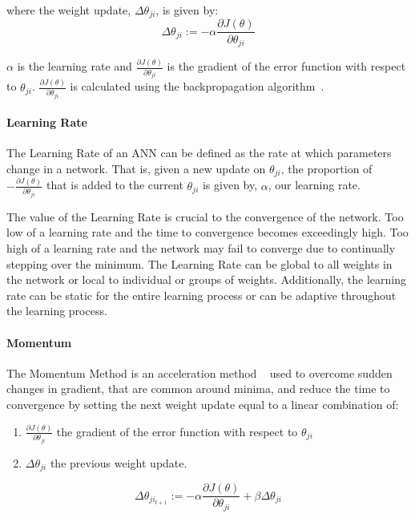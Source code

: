 \documentclass{article}
\begin{document}
where the weight update, $\Delta\theta_{ji}$, is given by:
\begin{equation}
	\Delta\theta_{ji} := -\alpha\frac{\partial{J}(\theta)}{\partial{\theta_{ji}}}
\end{equation}
 

 $\alpha$ is the learning rate and $\frac{\partial{J}(\theta)}{\partial{\theta_{ji}}}$ is the gradient of the error function with respect to $\theta_{ji}$.
$\frac{\partial{J}(\theta)}{\partial{\theta_{ji}}}$ is calculated using the backpropagation algorithm~\cite{backpropagationOriginal]}.

 
\paragraph{Learning Rate}
The Learning Rate of an ANN can be defined as the rate at which parameters change in a network. That is, given a new update on $\theta_{ji}$, the proportion of $-\frac{\partial{J}(\theta)}{\partial{\theta_{ji}}}$ that is added to the current $\theta_{ji}$ is given by, $\alpha$, our learning rate.
\hfill\newline

The value of the Learning Rate is crucial to the convergence of the network. Too low of a learning rate and the time to convergence becomes exceedingly high. Too high of a learning rate and the network may fail to converge due to continually stepping over the minimum. The Learning Rate can be global to all weights in the network or local to individual or groups of weights. Additionally, the learning rate can be static for the entire learning process or can be adaptive throughout the learning process.  
\paragraph{Momentum}
The Momentum Method is an acceleration method ~\cite{backpropagationOriginal} used to overcome sudden changes in gradient, that are common around minima, and reduce the time to convergence by setting the next weight update equal to a linear combination of:
\begin{enumerate}
	\item $\frac{\partial{J}(\theta)}{\partial{\theta_{ji}}}$ the gradient of the error function with respect to $\theta_{ji}$
	\item $\Delta\theta_{ji}$ the previous weight update.
\end{enumerate}  
\begin{equation}
\Delta\theta_{ji_{t+1}} := -\alpha\frac{\partial{J}(\theta)}{\partial{\theta_{ji}}} + \beta\Delta\theta_{ji}
\end{equation}
\end{document}
